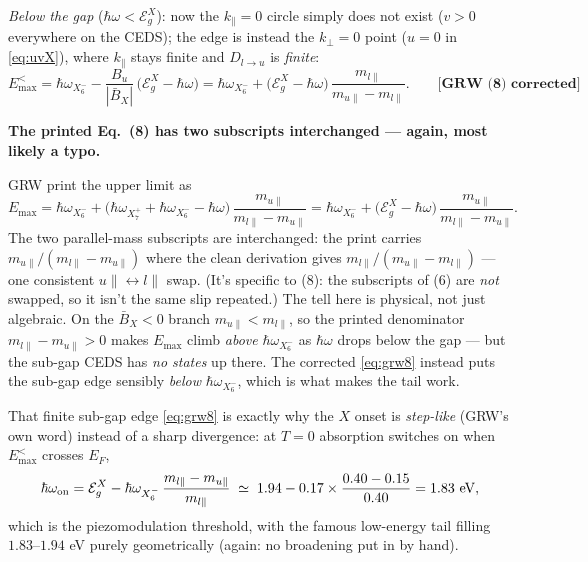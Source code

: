 \documentclass[11pt,a4paper]{article}
\newenvironment{printfix}[1]{%
  \begin{mdframed}[style=printfixstyle]%
  \noindent\textbf{\textcolor{BrickRed}{#1}}\par\smallskip\noindent\ignorespaces}%
  {\end{mdframed}}
\numberwithin{equation}{section}
\newcommand{\hw}{\hbar\omega}
\newcommand{\EgX}{\mathcal{E}_g^{X}}
\newcommand{\BX}{\bar{B}_X}
\newcommand{\kperp}{k_{\perp}}
\newcommand{\kpar}{k_{\parallel}}
\newcommand{\wXsix}{\hbar\omega_{X_6^-}}
\newcommand{\wXseven}{\hbar\omega_{X_7^+}}
\newcommand{\grwfix}[1]{\textbf{[GRW~(#1) corrected]}}
\begin{document}
\noindent
\emph{Below the gap} ($\hw<\EgX$): now the $\kpar=0$ circle simply
does not exist ($v>0$ everywhere on the CEDS); the edge is instead the
$\kperp=0$ point ($u=0$ in \eqref{eq:uvX}), where $\kpar$ stays
finite and $D_{l\to u}$ is \emph{finite}:
\begin{equation}
E_{\max}^{<}
=\wXsix-\frac{B_u}{|\BX|}\,\bigl(\EgX-\hw\bigr)
=\wXsix+\bigl(\EgX-\hw\bigr)\,
\frac{m_{l\parallel}}{m_{u\parallel}-m_{l\parallel}} .
\qquad\grwfix{8}
\label{eq:grw8}
\end{equation}

\begin{printfix}{The printed Eq.~(8) has two subscripts interchanged
--- again, most likely a typo.}
GRW print the upper limit as
\begin{equation*}
E_{\max}=\wXsix+\bigl(\wXseven+\wXsix-\hw\bigr)\,
\frac{m_{u\parallel}}{m_{l\parallel}-m_{u\parallel}}
=\wXsix+\bigl(\EgX-\hw\bigr)\,
\frac{m_{u\parallel}}{m_{l\parallel}-m_{u\parallel}}. \tag{8, as printed}
\end{equation*}
The two parallel-mass subscripts are interchanged: the print carries
$m_{u\parallel}/(m_{l\parallel}-m_{u\parallel})$ where the clean
derivation gives $m_{l\parallel}/(m_{u\parallel}-m_{l\parallel})$ ---
one consistent $u\!\parallel\!\leftrightarrow\!l\!\parallel$ swap.
(It's specific to (8): the subscripts of (6) are \emph{not} swapped,
so it isn't the same slip repeated.) The tell here is physical, not
just algebraic. On the $\BX<0$ branch $m_{u\parallel}<m_{l\parallel}$,
so the printed denominator $m_{l\parallel}-m_{u\parallel}>0$ makes
$E_{\max}$ climb \emph{above} $\wXsix$ as $\hw$ drops below the gap ---
but the sub-gap CEDS has \emph{no states} up there. The corrected
\eqref{eq:grw8} instead puts the sub-gap edge sensibly \emph{below}
$\wXsix$, which is what makes the tail work.
\end{printfix}

That finite sub-gap edge \eqref{eq:grw8} is exactly why the $X$ onset
is \emph{step-like} (GRW's own word) instead of a sharp divergence: at
$T=0$ absorption switches on when $E_{\max}^{<}$ crosses $E_F$,
\begin{equation}
\hw_{\rm on}
=\EgX-\wXsix\,\frac{m_{l\parallel}-m_{u\parallel}}{m_{l\parallel}}
\;\simeq\;1.94-0.17\times\frac{0.40-0.15}{0.40}
=1.83\ \text{eV},
\label{eq:onset}
\end{equation}
which is the piezomodulation threshold, with the famous low-energy
tail filling $1.83$--$1.94$ eV purely geometrically (again: no
broadening put in by hand).
\end{document}
